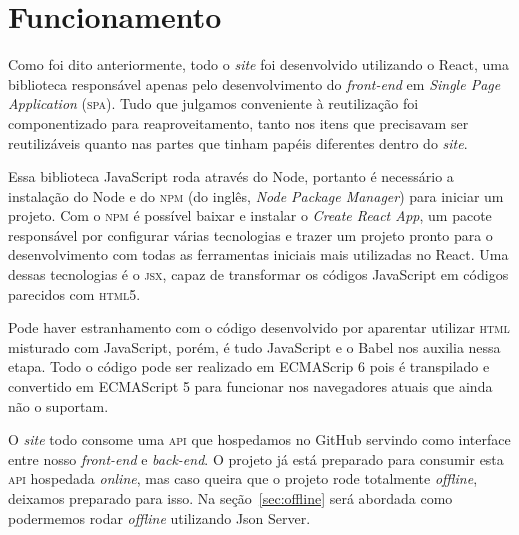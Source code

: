 \chapter{Funcionamento}
Como foi dito anteriormente, todo o \emph{site} foi desenvolvido utilizando o
React, uma biblioteca responsável apenas pelo desenvolvimento do
\emph{front-end} em \emph{Single Page Application} (\textsc{spa}). Tudo que
julgamos conveniente à reutilização foi componentizado para reaproveitamento,
tanto nos itens que precisavam ser reutilizáveis quanto nas partes que tinham
papéis diferentes dentro do \emph{site}.

Essa biblioteca JavaScript roda através do Node, portanto é necessário a
instalação do Node e do \textsc{npm} (do inglês, \emph{Node Package Manager})
para iniciar um projeto. Com o \textsc{npm} é possível baixar e instalar o
\emph{Create React App}, um pacote responsável por configurar várias tecnologias
e trazer um projeto pronto para o desenvolvimento com todas as ferramentas
iniciais mais utilizadas no React. Uma dessas tecnologias é o \textsc{jsx},
capaz de transformar os códigos JavaScript em códigos parecidos com
\textsc{html5}.

Pode haver estranhamento com o código desenvolvido por aparentar utilizar
\textsc{html} misturado com JavaScript, porém, é tudo JavaScript e o Babel nos
auxilia nessa etapa. Todo o código pode ser realizado em ECMAScrip 6 pois é
transpilado e convertido em ECMAScript 5 para funcionar nos navegadores atuais
que ainda não o suportam.

O \emph{site} todo consome uma \textsc{api} que hospedamos no GitHub servindo
como interface entre nosso \emph{front-end} e \emph{back-end}. O projeto já está
preparado para consumir esta \textsc{api} hospedada \emph{online}, mas caso
queira que o projeto rode totalmente \emph{offline}, deixamos preparado para
isso. Na seção~\ref{sec:offline} será abordada como podermemos rodar \emph{offline}
utilizando Json Server.

